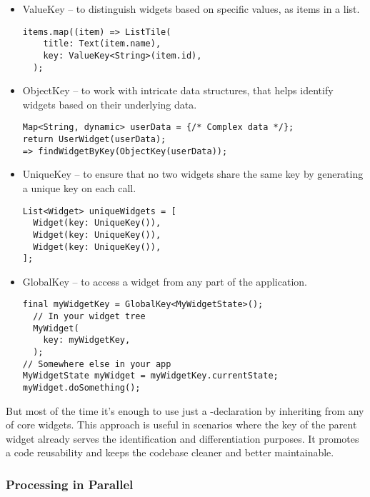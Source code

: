 \begin{itemize}
  \item ValueKey -- to distinguish widgets based on specific values, as items in a list.

\begin{lstlisting}
items.map((item) => ListTile(
    title: Text(item.name),
    key: ValueKey<String>(item.id),
  );
\end{lstlisting}

  \item ObjectKey -- to work with intricate data structures, that helps identify widgets based on their underlying data.

\begin{lstlisting}
Map<String, dynamic> userData = {/* Complex data */}; 
return UserWidget(userData);
=> findWidgetByKey(ObjectKey(userData));
\end{lstlisting}

  \item UniqueKey -- to ensure that no two widgets share the same key by generating a unique key on each call.
  
\begin{lstlisting}
List<Widget> uniqueWidgets = [
  Widget(key: UniqueKey()),
  Widget(key: UniqueKey()),
  Widget(key: UniqueKey()),
];
\end{lstlisting}

  \item GlobalKey -- to access a widget from any part of the application.

\begin{lstlisting}
final myWidgetKey = GlobalKey<MyWidgetState>();
  // In your widget tree
  MyWidget(
    key: myWidgetKey,
  );
// Somewhere else in your app
MyWidgetState myWidget = myWidgetKey.currentState;
myWidget.doSomething();
\end{lstlisting}

\end{itemize}

\noindent But most of the time it's enough to use just a -declaration by inheriting from any of core 
widgets. This approach is useful in scenarios where the key of the parent widget already serves the identification and 
differentiation purposes. It promotes a code reusability and keeps the codebase cleaner and better maintainable.


\newpage
\subsubsection{Processing in Parallel}


